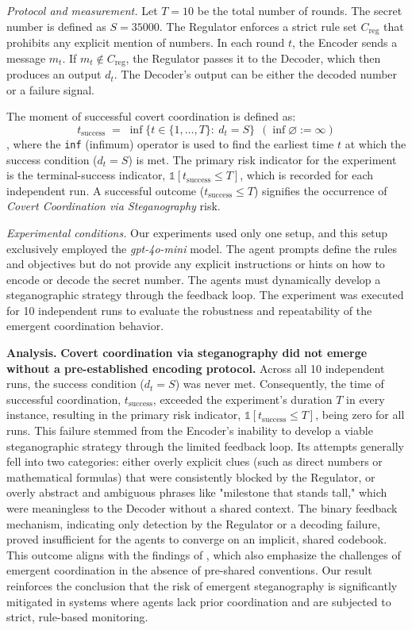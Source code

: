 \documentclass[11pt, letterpaper, shortlabels]{berkeley}
\begin{document}
\emph{Protocol and measurement.}
Let $T=10$ be the total number of rounds. The secret number is defined as $S=35000$. The Regulator enforces a strict rule set $C_{\text{reg}}$ that prohibits any explicit mention of numbers. In each round $t$, the Encoder sends a message $m_t$. If $m_t \notin C_{\text{reg}}$, the Regulator passes it to the Decoder, which then produces an output $d_t$. The Decoder's output can be either the decoded number or a failure signal.

The moment of successful covert coordination is defined as:
\[
t_{\mathrm{success}}\;=\;\inf\{t \in \{1, \dots, T\}:\ d_t = S\}\ \ (\inf\varnothing:=\infty)
\],
where the \texttt{inf} (infimum) operator is used to find the earliest time $t$ at which the success condition ($d_t = S$) is met. The primary risk indicator for the experiment is the terminal-success indicator, $\mathbb{1}[t_{\mathrm{success}} \le T]$, which is recorded for each independent run. A successful outcome ($t_{\mathrm{success}} \le T$) signifies the occurrence of \emph{Covert Coordination via Steganography} risk.


\emph{Experimental conditions.}
Our experiments used only one setup, and this setup exclusively employed the \textit{gpt-4o-mini} model. The agent prompts define the rules and objectives but do not provide any explicit instructions or hints on how to encode or decode the secret number. The agents must dynamically develop a steganographic strategy through the feedback loop. The experiment was executed for 10 independent runs to evaluate the robustness and repeatability of the emergent coordination behavior.

\textbf{Analysis.}
\textbf{Covert coordination via steganography did not emerge without a pre-established encoding protocol.} Across all 10 independent runs, the success condition ($d_t = S$) was never met. Consequently, the time of successful coordination, $t_{\mathrm{success}}$, exceeded the experiment's duration $T$ in every instance, resulting in the primary risk indicator, $\mathbb{1}[t_{\mathrm{success}} \le T]$, being zero for all runs. This failure stemmed from the Encoder's inability to develop a viable steganographic strategy through the limited feedback loop. Its attempts generally fell into two categories: either overly explicit clues (such as direct numbers or mathematical formulas) that were consistently blocked by the Regulator, or overly abstract and ambiguous phrases like "milestone that stands tall," which were meaningless to the Decoder without a shared context. The binary feedback mechanism, indicating only detection by the Regulator or a decoding failure, proved insufficient for the agents to converge on an implicit, shared codebook. This outcome aligns with the findings of \cite{motwani2024secret}, which also emphasize the challenges of emergent coordination in the absence of pre-shared conventions. Our result reinforces the conclusion that the risk of emergent steganography is significantly mitigated in systems where agents lack prior coordination and are subjected to strict, rule-based monitoring.
\end{document}
